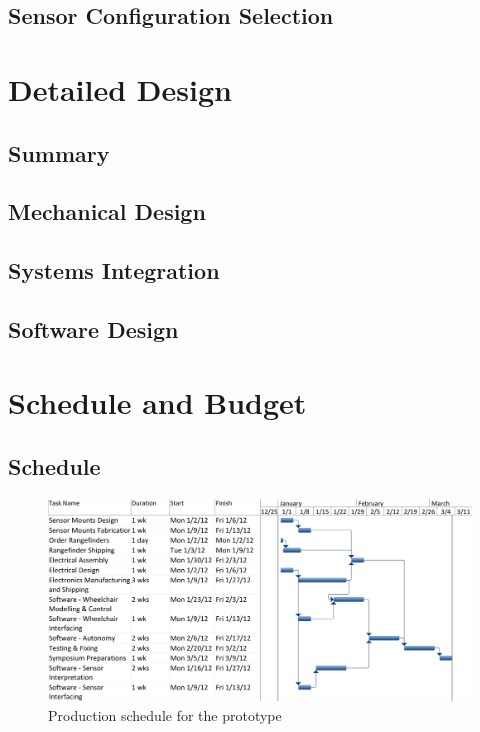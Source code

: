 \documentclass[oneside,final]{report}
\begin{document}
\section{Sensor Configuration Selection}


\chapter{Detailed Design}

\section{Summary}

\section{Mechanical Design}

\section{Systems Integration}

\section{Software Design}

\chapter{Schedule and Budget}

\section{Schedule}
\begin{figure}[htb]
 \centering
 \includegraphics[scale=0.6]{gantt.png}
 \caption{Production schedule for the prototype}
 \label{schedule}
\end{figure}
\end{document}
